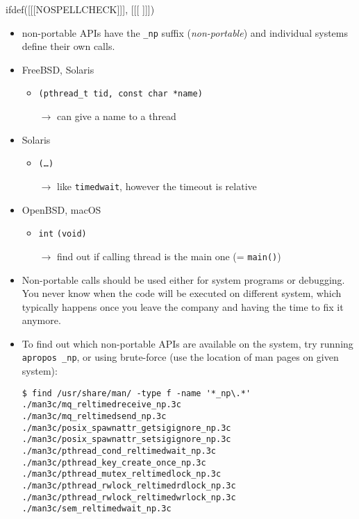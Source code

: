 
ifdef([[[NOSPELLCHECK]]], [[[
]]])

\begin{slide}

\begin{itemize}
\item non-portable APIs have the \texttt{\_np} suffix (\emph{non-portable}) and
individual systems define their own calls.

\item FreeBSD, Solaris
\begin{itemize}
\item {}\texttt{(pthread\_t tid, const char *name)}
\item[$\rightarrow$] can give a name to a thread
\end{itemize}

\item Solaris
\begin{itemize}
\item {}\texttt{(\dots)}
\item[$\rightarrow$] like \texttt{timedwait}, however the timeout is relative
\end{itemize}

\item OpenBSD, macOS
\begin{itemize}
\item \texttt{int} \texttt{(void)}
\item[$\rightarrow$] find out if calling thread is the main one
(= \texttt{main()})
\end{itemize}

\end{itemize}
\end{slide}

\begin{itemize}
\item Non-portable calls should be used either for system programs or
debugging. You never know when the code will be executed on different system,
which typically happens once you leave the company and having the time to
fix it anymore.
\item To find out which non-portable APIs are available on the system,
try running \texttt{apropos \_np}, or using brute-force (use the location
of man pages on given system):
\begin{verbatim}
$ find /usr/share/man/ -type f -name '*_np\.*'
./man3c/mq_reltimedreceive_np.3c
./man3c/mq_reltimedsend_np.3c
./man3c/posix_spawnattr_getsigignore_np.3c
./man3c/posix_spawnattr_setsigignore_np.3c
./man3c/pthread_cond_reltimedwait_np.3c
./man3c/pthread_key_create_once_np.3c
./man3c/pthread_mutex_reltimedlock_np.3c
./man3c/pthread_rwlock_reltimedrdlock_np.3c
./man3c/pthread_rwlock_reltimedwrlock_np.3c
./man3c/sem_reltimedwait_np.3c
\end{verbatim}
\end{itemize}

\pagebreak

\endinput
